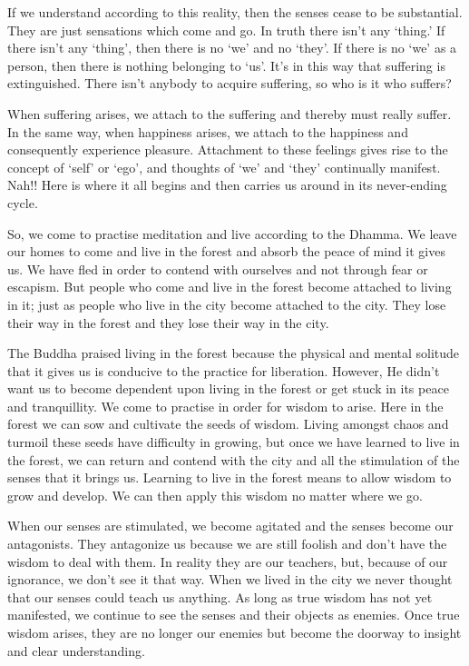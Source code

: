 If we understand according to this reality, then the senses cease to be substantial. They are just sensations which come and go. In truth there isn't any `thing.' If there isn't any `thing', then there is no `we' and no `they'. If there is no `we' as a person, then there is nothing belonging to `us'. It's in this way that suffering is extinguished. There isn't anybody to acquire suffering, so who is it who suffers?

When suffering arises, we attach to the suffering and thereby must really suffer. In the same way, when happiness arises, we attach to the happiness and consequently experience pleasure. Attachment to these feelings gives rise to the concept of `self' or `ego', and thoughts of `we' and `they' continually manifest. Nah!! Here is where it all begins and then carries us around in its never-ending cycle.

So, we come to practise meditation and live according to the Dhamma. We leave our homes to come and live in the forest and absorb the peace of mind it gives us. We have fled in order to contend with ourselves and not through fear or escapism. But people who come and live in the forest become attached to living in it; just as people who live in the city become attached to the city. They lose their way in the forest and they lose their way in the city.

The Buddha praised living in the forest because the physical and mental solitude that it gives us is conducive to the practice for liberation. However, He didn't want us to become dependent upon living in the forest or get stuck in its peace and tranquillity. We come to practise in order for wisdom to arise. Here in the forest we can sow and cultivate the seeds of wisdom. Living amongst chaos and turmoil these seeds have difficulty in growing, but once we have learned to live in the forest, we can return and contend with the city and all the stimulation of the senses that it brings us. Learning to live in the forest means to allow wisdom to grow and develop. We can then apply this wisdom no matter where we go.

When our senses are stimulated, we become agitated and the senses become our antagonists. They antagonize us because we are still foolish and don't have the wisdom to deal with them. In reality they are our teachers, but, because of our ignorance, we don't see it that way. When we lived in the city we never thought that our senses could teach us anything. As long as true wisdom has not yet manifested, we continue to see the senses and their objects as enemies. Once true wisdom arises, they are no longer our enemies but become the doorway to insight and clear understanding.

